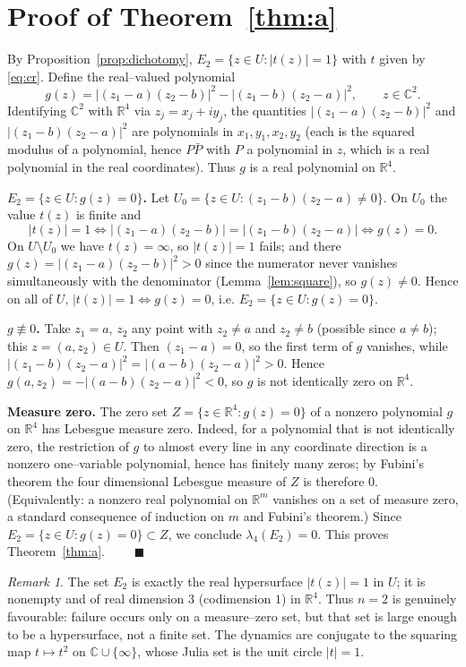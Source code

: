 \documentclass{amsart}
\theoremstyle{definition}
\theoremstyle{remark}
\newtheorem{remark}{Remark}
\newcommand{\C}{\mathbb{C}}
\newcommand{\R}{\mathbb{R}}
\begin{document}
\section{Proof of Theorem~\ref{thm:a}}

By Proposition~\ref{prop:dichotomy}, $E_2=\{z\in U:|t(z)|=1\}$ with $t$ given by
\eqref{eq:cr}. Define the real--valued polynomial
\[
g(z)=\bigl|(z_1-a)(z_2-b)\bigr|^2-\bigl|(z_1-b)(z_2-a)\bigr|^2,\qquad z\in\C^2 .
\]
Identifying $\C^2$ with $\R^4$ via $z_j=x_j+iy_j$, the quantities $|(z_1-a)(z_2-b)|^2$ and
$|(z_1-b)(z_2-a)|^2$ are polynomials in $x_1,y_1,x_2,y_2$ (each is the squared modulus of a
polynomial, hence $P\bar P$ with $P$ a polynomial in $z$, which is a real polynomial in the
real coordinates). Thus $g$ is a real polynomial on $\R^4$.

\textbf{$E_2=\{z\in U:g(z)=0\}$.} Let $U_0=\{z\in U:(z_1-b)(z_2-a)\neq0\}$. On $U_0$ the
value $t(z)$ is finite and
\[
|t(z)|=1\iff \bigl|(z_1-a)(z_2-b)\bigr|=\bigl|(z_1-b)(z_2-a)\bigr|\iff g(z)=0 .
\]
On $U\setminus U_0$ we have $t(z)=\infty$, so $|t(z)|=1$ fails; and there
$g(z)=|(z_1-a)(z_2-b)|^2>0$ since the numerator never vanishes simultaneously with the
denominator (Lemma~\ref{lem:square}), so $g(z)\neq0$. Hence on all of $U$,
$|t(z)|=1\iff g(z)=0$, i.e. $E_2=\{z\in U:g(z)=0\}$.

\textbf{$g\not\equiv0$.} Take $z_1=a$, $z_2$ any point with $z_2\neq a$ and $z_2\neq b$
(possible since $a\neq b$); this $z=(a,z_2)\in U$. Then $(z_1-a)=0$, so the first term of
$g$ vanishes, while $|(z_1-b)(z_2-a)|^2=|(a-b)(z_2-a)|^2>0$. Hence
$g(a,z_2)=-|(a-b)(z_2-a)|^2<0$, so $g$ is not identically zero on $\R^4$.

\textbf{Measure zero.} The zero set $Z=\{z\in\R^4:g(z)=0\}$ of a nonzero polynomial $g$ on
$\R^4$ has Lebesgue measure zero. Indeed, for a polynomial that is not identically zero, the
restriction of $g$ to almost every line in any coordinate direction is a nonzero
one--variable polynomial, hence has finitely many zeros; by Fubini's theorem the four
dimensional Lebesgue measure of $Z$ is therefore $0$. (Equivalently: a nonzero real
polynomial on $\R^m$ vanishes on a set of measure zero, a standard consequence of induction
on $m$ and Fubini's theorem.) Since $E_2=\{z\in U:g(z)=0\}\subset Z$, we conclude
$\lambda_4(E_2)=0$. This proves Theorem~\ref{thm:a}. $\qquad\blacksquare$

\begin{remark}
The set $E_2$ is exactly the real hypersurface $|t(z)|=1$ in $U$; it is nonempty and of real
dimension $3$ (codimension $1$) in $\R^4$. Thus $n=2$ is genuinely favourable: failure occurs
only on a measure--zero set, but that set is large enough to be a hypersurface, not a finite
set. The dynamics are conjugate to the squaring map $t\mapsto t^2$ on $\C\cup\{\infty\}$,
whose Julia set is the unit circle $|t|=1$.
\end{remark}
\end{document}
